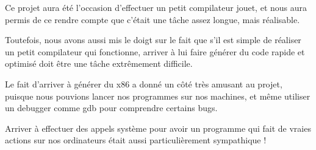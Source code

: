 \documentclass{scrartcl}
\begin{document}
Ce projet aura été l'occasion d'effectuer un petit compilateur jouet,
et nous aura permis de ce rendre compte que c'était une tâche assez longue,
mais réalisable.

Toutefois, nous avons aussi mis le doigt sur le fait que s'il est simple
de réaliser un petit compilateur qui fonctionne, arriver à lui faire
générer du code rapide et optimisé doit être une tâche extrêmement difficile.


Le fait d'arriver à générer du x86 a donné un côté très amusant au projet,
puisque nous pouvions lancer nos programmes sur nos machines, et même
utiliser un debugger comme gdb pour comprendre certains bugs.

Arriver à effectuer des appels système pour avoir un programme qui fait
de vraies actions sur nos ordinateurs était aussi particulièrement sympathique !
\end{document}
